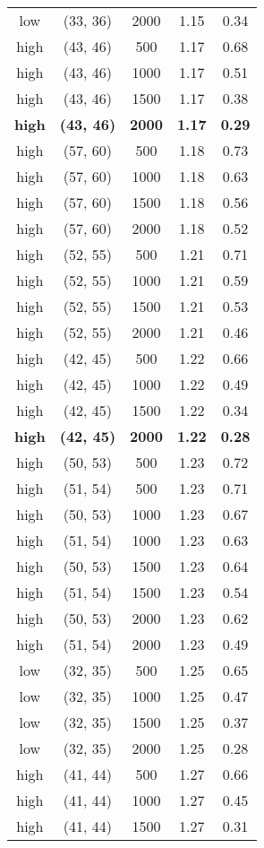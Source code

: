 \begin{tabular}{c c c c c}
low & (33, 36) &  2000 & 1.15 & 0.34 \\
high & (43, 46) &  500 & 1.17 & 0.68 \\
high & (43, 46) &  1000 & 1.17 & 0.51 \\
high & (43, 46) &  1500 & 1.17 & 0.38 \\
\textbf{high} & \textbf{(43, 46)} & \textbf{ 2000} & \textbf{1.17} & \textbf{0.29} \\
high & (57, 60) &  500 & 1.18 & 0.73 \\
high & (57, 60) &  1000 & 1.18 & 0.63 \\
high & (57, 60) &  1500 & 1.18 & 0.56 \\
high & (57, 60) &  2000 & 1.18 & 0.52 \\
high & (52, 55) &  500 & 1.21 & 0.71 \\
high & (52, 55) &  1000 & 1.21 & 0.59 \\
high & (52, 55) &  1500 & 1.21 & 0.53 \\
high & (52, 55) &  2000 & 1.21 & 0.46 \\
high & (42, 45) &  500 & 1.22 & 0.66 \\
high & (42, 45) &  1000 & 1.22 & 0.49 \\
high & (42, 45) &  1500 & 1.22 & 0.34 \\
\textbf{high} & \textbf{(42, 45)} & \textbf{ 2000} & \textbf{1.22} & \textbf{0.28} \\
high & (50, 53) &  500 & 1.23 & 0.72 \\
high & (51, 54) &  500 & 1.23 & 0.71 \\
high & (50, 53) &  1000 & 1.23 & 0.67 \\
high & (51, 54) &  1000 & 1.23 & 0.63 \\
high & (50, 53) &  1500 & 1.23 & 0.64 \\
high & (51, 54) &  1500 & 1.23 & 0.54 \\
high & (50, 53) &  2000 & 1.23 & 0.62 \\
high & (51, 54) &  2000 & 1.23 & 0.49 \\
low & (32, 35) &  500 & 1.25 & 0.65 \\
low & (32, 35) &  1000 & 1.25 & 0.47 \\
low & (32, 35) &  1500 & 1.25 & 0.37 \\
low & (32, 35) &  2000 & 1.25 & 0.28 \\
high & (41, 44) &  500 & 1.27 & 0.66 \\
high & (41, 44) &  1000 & 1.27 & 0.45 \\
high & (41, 44) &  1500 & 1.27 & 0.31 \\

\end{tabular}
